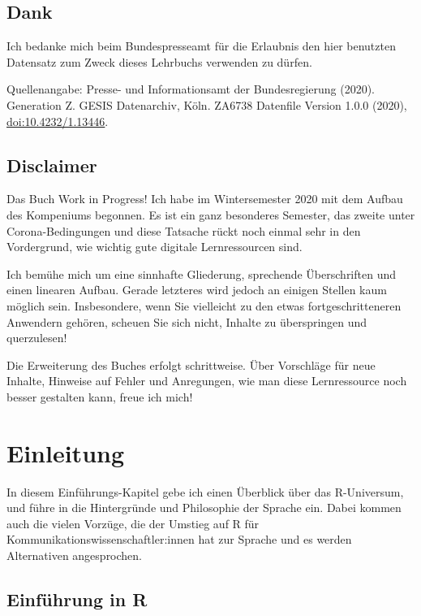 \documentclass[
]{book}
\begin{document}
\hypertarget{dank}{%
\section*{Dank}\label{dank}}

Ich bedanke mich beim Bundespresseamt für die Erlaubnis den hier benutzten Datensatz zum Zweck dieses Lehrbuchs verwenden zu dürfen.

Quellenangabe:
Presse- und Informationsamt der Bundesregierung (2020). Generation Z. GESIS Datenarchiv, Köln. ZA6738 Datenfile Version 1.0.0 (2020), \url{doi:10.4232/1.13446}.

\hypertarget{disclaimer}{%
\section*{Disclaimer}\label{disclaimer}}

Das Buch Work in Progress! Ich habe im Wintersemester 2020 mit dem Aufbau des Kompeniums begonnen. Es ist ein ganz besonderes Semester, das zweite unter Corona-Bedingungen und diese Tatsache rückt noch einmal sehr in den Vordergrund, wie wichtig gute digitale Lernressourcen sind.

Ich bemühe mich um eine sinnhafte Gliederung, sprechende Überschriften und einen linearen Aufbau. Gerade letzteres wird jedoch an einigen Stellen kaum möglich sein. Insbesondere, wenn Sie vielleicht zu den etwas fortgeschritteneren Anwendern gehören, scheuen Sie sich nicht, Inhalte zu überspringen und querzulesen!

Die Erweiterung des Buches erfolgt schrittweise. Über Vorschläge für neue Inhalte, Hinweise auf Fehler und Anregungen, wie man diese Lernressource noch besser gestalten kann, freue ich mich!

\hypertarget{intro}{%
\chapter{Einleitung}\label{intro}}

In diesem Einführungs-Kapitel gebe ich einen Überblick über das R-Universum, und führe in die Hintergründe und Philosophie der Sprache ein. Dabei kommen auch die vielen Vorzüge, die der Umstieg auf R für Kommunikationswissenschaftler:innen hat zur Sprache und es werden Alternativen angesprochen.

\hypertarget{einfuxfchrung-in-r}{%
\section{Einführung in R}\label{einfuxfchrung-in-r}}
\end{document}

